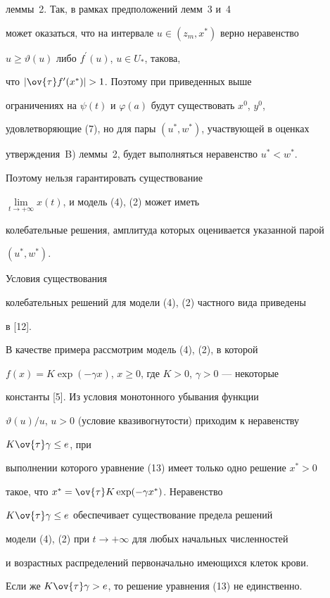 леммы~2. Так, в рамках предположений лемм~3 и~4


может оказаться, что на интервале $u \in (z_{m}, x^{*})$ верно неравенство


$u \geq \vartheta(u)$ либо $f^{\prime}(u)$, $u \in U_{*}$, такова,


что $| \ov{\tau} f^{\prime}(x^{*}) | > 1$. Поэтому при приведенных выше


ограничениях на $\psi(t)$ и $\varphi(a)$ будут существовать $x^{0}$, $y^{0}$,


удовлетворяющие (7), но для пары $(u^{*}, w^{*})$, участвующей в оценках


утверждения~B) леммы~2, будет выполняться неравенство $u^{*} < w^{*}$.


Поэтому нельзя гарантировать существование


$\lim\limits_{t\to+\infty} x(t)$, и модель (4), (2) может иметь


колебательные решения, амплитуда которых оценивается указанной парой


$(u^{*}, w^{*})$.


Условия существования


колебательных решений для модели (4), (2) частного вида приведены


в [12].





В качестве примера рассмотрим модель (4), (2), в которой


$f(x)=K \exp(- \gamma x)$, $x \geq 0$, где $K>0$, $\gamma>0$ --- некоторые


константы [5]. Из условия монотонного убывания функции


$\vartheta(u)/u$, $u > 0$ (условие квазивогнутости) приходим к неравенству


$K \ov{\tau} \gamma \leq e$, при


выполнении которого уравнение (13) имеет только одно решение $x^{*} > 0$


такое, что $x^{*}= \ov{\tau} K \exp(- \gamma x^{*})$. Неравенство


$K \ov{\tau} \gamma \leq e$ обеспечивает существование предела решений


модели (4), (2) при $t \to+\infty$ для любых начальных численностей


и возрастных распределений первоначально имеющихся клеток крови.


Если же $K \ov{\tau} \gamma > e$, то решение уравнения (13) не единственно.


